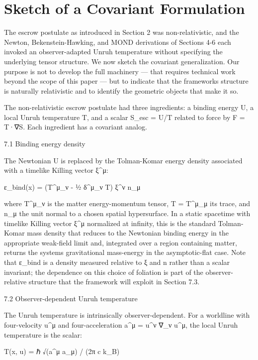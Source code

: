 \documentclass[11pt]{article}
\begin{document}
\section{Sketch of a Covariant Formulation}\label{sketch-of-a-covariant-formulation}

The escrow postulate as introduced in Section 2 was non-relativistic, and the Newton, Bekenstein-Hawking, and MOND derivations of Sections 4-6 each invoked an observer-adapted Unruh temperature without specifying the underlying tensor structure. We now sketch the covariant generalization. Our purpose is not to develop the full machinery --- that requires technical work beyond the scope of this paper --- but to indicate that the framework\textquotesingle s structure is naturally relativistic and to identify the geometric objects that make it so.

The non-relativistic escrow postulate had three ingredients: a binding energy U, a local Unruh temperature T, and a scalar S\_esc = \textbar U\textbar/T related to force by F = T·∇S. Each ingredient has a covariant analog.

7.1 Binding energy density

The Newtonian U is replaced by the Tolman-Komar energy density associated with a timelike Killing vector ξ\^{}μ:

ε\_bind(x) = (T\^{}μ\_ν - ½ δ\^{}μ\_ν T) ξ\^{}ν n\_μ

where T\^{}μ\_ν is the matter energy-momentum tensor, T = T\^{}μ\_μ its trace, and n\_μ the unit normal to a chosen spatial hypersurface. In a static spacetime with timelike Killing vector ξ\^{}μ normalized at infinity, this is the standard Tolman-Komar mass density that reduces to the Newtonian binding energy in the appropriate weak-field limit and, integrated over a region containing matter, returns the system\textquotesingle s gravitational mass-energy in the asymptotic-flat case. Note that ε\_bind is a density measured relative to ξ and n rather than a scalar invariant; the dependence on this choice of foliation is part of the observer-relative structure that the framework will exploit in Section 7.3.

7.2 Observer-dependent Unruh temperature

The Unruh temperature is intrinsically observer-dependent. For a worldline with four-velocity u\^{}μ and four-acceleration a\^{}μ = u\^{}ν ∇\_ν u\^{}μ, the local Unruh temperature is the scalar:

T(x, u) = ℏ √(a\^{}μ a\_μ) / (2π c k\_B)
\end{document}
